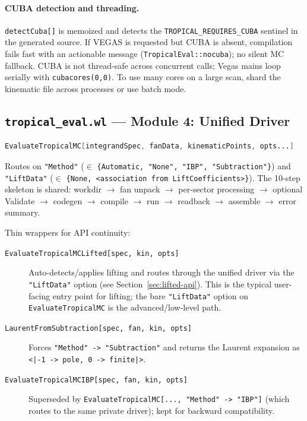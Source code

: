 \documentclass[11pt,a4paper]{article}
\begin{document}
\paragraph{CUBA detection and threading.} \texttt{detectCuba[]} is memoized and detects the \texttt{TROPICAL\_REQUIRES\_CUBA} sentinel in the generated source. If VEGAS is requested but CUBA is absent, compilation fails fast with an actionable message (\texttt{TropicalEval::nocuba}); no silent MC fallback. CUBA is not thread-safe across concurrent calls; Vegas mains loop serially with \texttt{cubacores(0,0)}. To use many cores on a large scan, shard the kinematic file across processes or use batch mode.

\subsection{\texttt{tropical\_eval.wl} --- Module 4: Unified Driver}

\begin{lstlisting}[language=Mathematica]
EvaluateTropicalMC[integrandSpec, fanData, kinematicPoints, opts...]
\end{lstlisting}

Routes on \texttt{"Method"} ($\in$ \texttt{\{Automatic, "None", "IBP", "Subtraction"\}}) and \texttt{"LiftData"} ($\in$ \texttt{\{None, <association from \texttt{LiftCoefficients}>\}}). The 10-step skeleton is shared: workdir $\to$ fan unpack $\to$ per-sector processing $\to$ optional Validate $\to$ codegen $\to$ compile $\to$ run $\to$ readback $\to$ assemble $\to$ error summary.

Thin wrappers for API continuity:
\begin{description}
  \item[\texttt{EvaluateTropicalMCLifted[spec, kin, opts]}] Auto-detects/applies lifting and routes through the unified driver via the \texttt{"LiftData"} option (see Section~\ref{sec:lifted-api}). This is the typical user-facing entry point for lifting; the bare \texttt{"LiftData"} option on \texttt{EvaluateTropicalMC} is the advanced/low-level path.
  \item[\texttt{LaurentFromSubtraction[spec, fan, kin, opts]}] Forces \texttt{"Method" -> "Subtraction"} and returns the Laurent expansion as \texttt{<|{-1} -> pole, 0 -> finite|>}.
  \item[\texttt{EvaluateTropicalMCIBP[spec, fan, kin, opts]}] Superseded by \texttt{EvaluateTropicalMC[..., "Method" -> "IBP"]} (which routes to the same private driver); kept for backward compatibility.
\end{description}
\end{document}
